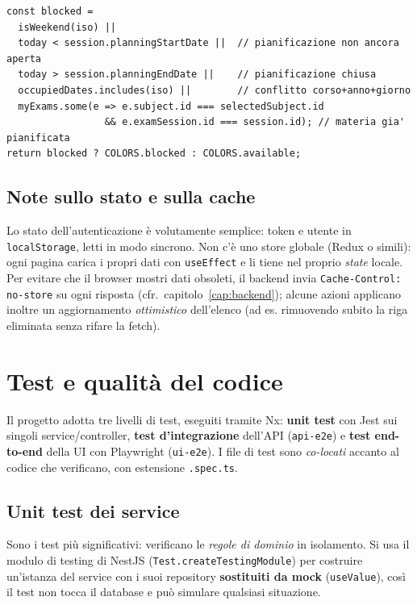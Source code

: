 \documentclass[11pt,a4paper,oneside]{report}
\newcommand{\code}[1]{\texttt{\small #1}}
\newcommand{\file}[1]{\texttt{\small #1}}
\begin{document}
\begin{lstlisting}[caption={Calcolo del colore di un giorno, vista Docente (estratto).}]
const blocked =
  isWeekend(iso) ||
  today < session.planningStartDate ||  // pianificazione non ancora aperta
  today > session.planningEndDate ||    // pianificazione chiusa
  occupiedDates.includes(iso) ||        // conflitto corso+anno+giorno
  myExams.some(e => e.subject.id === selectedSubject.id
                 && e.examSession.id === session.id); // materia gia' pianificata
return blocked ? COLORS.blocked : COLORS.available;
\end{lstlisting}

\section{Note sullo stato e sulla cache}
Lo stato dell'autenticazione è volutamente semplice: token e utente in
\code{localStorage}, letti in modo sincrono. Non c'è uno store globale (Redux o
simili): ogni pagina carica i propri dati con \code{useEffect} e li tiene nel
proprio \emph{state} locale. Per evitare che il browser mostri dati obsoleti, il
backend invia \code{Cache-Control: no-store} su ogni risposta
(cfr.~capitolo~\ref{cap:backend}); alcune azioni applicano inoltre un
aggiornamento \emph{ottimistico} dell'elenco (ad es. rimuovendo subito la riga
eliminata senza rifare la fetch).

\chapter{Test e qualità del codice}
\label{cap:test}

Il progetto adotta tre livelli di test, eseguiti tramite Nx: \textbf{unit test}
con Jest sui singoli service/controller, \textbf{test d'integrazione} dell'API
(\code{api-e2e}) e \textbf{test end-to-end} della UI con Playwright
(\code{ui-e2e}). I file di test sono \emph{co-locati} accanto al codice che
verificano, con estensione \file{.spec.ts}.

\section{Unit test dei service}
Sono i test più significativi: verificano le \emph{regole di dominio} in
isolamento. Si usa il modulo di testing di NestJS
(\code{Test.createTestingModule}) per costruire un'istanza del service con i
suoi repository \textbf{sostituiti da mock} (\code{useValue}), così il test non
tocca il database e può simulare qualsiasi situazione.
\end{document}
